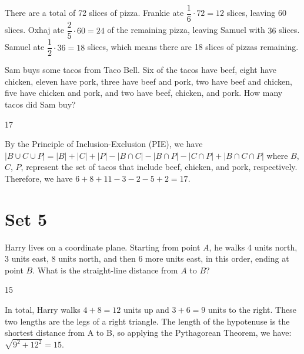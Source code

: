\documentclass[11pt]{article}
\begin{document}
\begin{solution} %
There are a total of 72 slices of pizza. Frankie ate $\dfrac{1}{6} \cdot 72 = 12$ slices, leaving 60 slices. Oxhaj ate $\dfrac{2}{5} \cdot 60 = 24$ of the remaining pizza, leaving Samuel with $36$ slices. Samuel ate $\dfrac{1}{2} \cdot 36 = 18$ slices, which means there are 18 slices of pizzas remaining. 
\end{solution}

\begin{problem} %
Sam buys some tacos from Taco Bell. Six of the tacos have beef, eight have chicken, eleven have pork, three have beef and pork, two have beef and chicken, five have chicken and pork, and two have beef, chicken, and pork. How many tacos did Sam buy?
\end{problem}

\begin{answer}
17
\end{answer}

\begin{solution} %
By the Principle of Inclusion-Exclusion (PIE), we have $|B \cup C \cup P| = |B| + |C| + |P| - |B \cap C| - |B \cap P| - | C \cap P| + |B \cap C \cap P|$ where $B$, $C$, $P$, represent the set of tacos that include beef, chicken, and pork, respectively. Therefore, we have $6+8+11-3-2-5+2=17$.
\end{solution}

\newpage

\section*{Set 5}

\begin{problem} %
Harry lives on a coordinate plane. Starting from point $A$, he walks 4 units north, 3 units east, 8 units north, and then 6 more units east, in this order, ending at point $B$. What is the straight-line distance from $A$ to $B$?
\end{problem}

\begin{answer}
15
\end{answer}

\begin{solution} %
In total, Harry walks $4+8 = 12$ units up and $3+6=9$ units to the right. These two lengths are the legs of a right triangle. The length of the hypotenuse is the shortest distance from A to B, so applying the Pythagorean Theorem, we have: $\sqrt{9^2+12^2} = 15$.
\end{solution}
\end{document}
